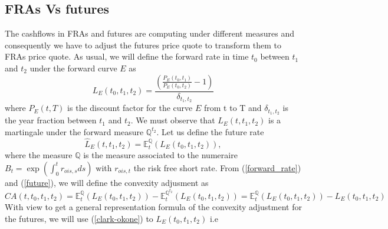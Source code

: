 \documentclass[a4paper,10pt]{article}
\newcommand{\1}{\mathbf{1}}
\begin{document}
\subsection{FRAs Vs futures}
The cashflows in FRAs and futures are computing under different measures and consequently we have to adjust the futures price quote to transform them to FRAs price quote. As usual, we will define the forward rate  in time $t_0$ between $t_1$ and $t_2$ under the forward curve $E$ as
\begin{equation}\label{forward_rate}
L_{E}(t_0, t_1, t_2) = \frac{\left(\frac{P_{E}(t_0,t_1)}{P_{E}(t_0,t_2)} - 1 \right)}{\delta_{t_1,t_2}}
\end{equation} 
where $P_{E}(t,T)$ is the discount factor for the curve $E$ from t to T and $\delta_{t_1,t_2}$ is the year fraction between $t_1$ and $t_2$. We must observe that $L_{E}(t, t_1, t_2)$ is a martingale under the forward measure $\mathbb{Q}^{t_2}$. Let us define the future rate   
\begin{equation}\label{future}
\hat{L}_{E}(t, t_1, t_2) = \mathbb{E}_t^{\mathbb{Q}}\left(L_{E}(t_0, t_1, t_2) \right), 
\end{equation}
where the measure $\mathbb{Q}$ is the measure associated to the numeraire $B_t=\exp\left(\int_{0}^{t} r_{ois, s} ds \right)$ with $ r_{ois, t}$ the risk free short rate. From (\ref{forward_rate}) and (\ref{future}), we will define the convexity adjusment as
\begin{equation*}
CA(t, t_0, t_1, t_2) = \mathbb{E}_t^{\mathbb{Q}}\left(L_{E}(t_0, t_1, t_2) \right) - \mathbb{E}_t^{\mathbb{Q}^{t_2}}\left(L_{E}(t_0, t_1, t_2) \right) =  \mathbb{E}_t^{\mathbb{Q}}\left(L_{E}(t_0, t_1, t_2) \right) - L_{E}(t_0, t_1, t_2)
\end{equation*}
With view to get a general representation formula of the convexity adjustment for the futures, we will use (\ref{clark-okone}) to 
$L_{E}(t_0,t_1,t_2)$ i.e
\end{document}
